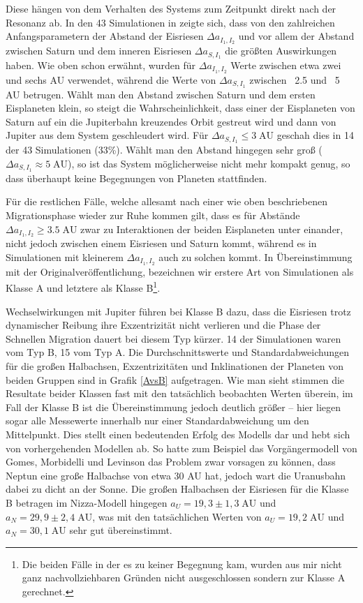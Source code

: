 \documentclass[10pt,a4paper,twoside]{article}
\begin{document}
\newcommand{\AU}{\;\mathrm{AU}}
\newcommand{\DII}{\Delta a_{I_1,I_2}}
\newcommand{\DSI}{\Delta a_{S,I_1}} %
Diese hängen von dem Verhalten des Systems zum Zeitpunkt direkt nach der Resonanz ab. In den 43 Simulationen in \cite{Tsiganis2005} zeigte sich, dass von den zahlreichen Anfangsparametern der Abstand der Eisriesen $\DII$ und vor allem der Abstand zwischen Saturn und dem inneren Eisriesen $\DSI$ die größten Auswirkungen haben\cite{Tsiganis2005}. %
Wie oben schon erwähnt, wurden für $\DII$ Werte zwischen etwa zwei und sechs AU verwendet, während die Werte von $\DSI$ zwischen ~2.5 und ~5 AU betrugen\cite{Tsiganis2005}.
Wählt man den Abstand zwischen Saturn und dem ersten Eisplaneten klein, so steigt die Wahrscheinlichkeit, dass einer der Eisplaneten von Saturn auf ein die Jupiterbahn kreuzendes Orbit gestreut wird und dann von Jupiter aus dem System geschleudert wird. Für $\DSI \le 3 \AU $ geschah dies in 14 der 43 Simulationen (33\%).
Wählt man den Abstand hingegen sehr groß ($\DSI \approx 5 \AU$), so ist das System möglicherweise nicht mehr kompakt genug, so dass überhaupt keine Begegnungen von Planeten stattfinden. %

Für die restlichen Fälle, welche allesamt nach einer wie oben beschriebenen Migrationsphase wieder zur Ruhe kommen %
gilt, dass es für Abstände $\DII \ge 3.5 \AU$ zwar zu Interaktionen der beiden Eisplaneten unter einander, nicht jedoch zwischen einem Eisriesen und Saturn kommt, während es in Simulationen mit kleinerem $\DII$ auch zu solchen kommt. In Übereinstimmung mit der Originalveröffentlichung, bezeichnen wir erstere Art von Simulationen als Klasse A und letztere als Klasse B\footnote{Die beiden Fälle in der es zu keiner Begegnung kam, wurden aus mir nicht ganz nachvollziehbaren Gründen nicht ausgeschlossen sondern zur Klasse A gerechnet.}.

Wechselwirkungen mit Jupiter führen bei Klasse B dazu, dass die Eisriesen trotz dynamischer Reibung ihre Exzentrizität nicht verlieren und die Phase der Schnellen Migration dauert bei diesem Typ kürzer.
14 der Simulationen waren vom Typ B, 15 vom Typ A.
Die Durchschnittswerte und Standardabweichungen für die großen Halbachsen, Exzentrizitäten und Inklinationen der Planeten von beiden Gruppen sind in Grafik \ref{AvsB} aufgetragen. Wie man sieht stimmen die Resultate beider Klassen fast mit den tatsächlich beobachten Werten überein, im Fall der Klasse B ist die Übereinstimmung jedoch deutlich größer – hier liegen sogar alle Messewerte innerhalb nur einer Standardabweichung um den Mittelpunkt\cite{Tsiganis2005}.
Dies stellt einen bedeutenden Erfolg des Modells dar und hebt sich von vorhergehenden Modellen ab.
So hatte zum Beispiel das Vorgängermodell von Gomes, Morbidelli und Levinson \cite{Gomes2004} %
das Problem zwar vorsagen zu können, dass Neptun eine große Halbachse von etwa 30 AU hat, jedoch wart die Uranusbahn dabei zu dicht an der Sonne.
Die großen Halbachsen der Eisriesen für die Klasse B betragen im Nizza-Modell hingegen $a_U = 19,3 \pm 1,3 \AU$ und $a_N = 29,9 \pm 2,4 \AU$, was mit den tatsächlichen Werten von $a_U = 19,2 \AU$ und $a_N = 30,1 \AU$ sehr gut übereinstimmt\cite{Tsiganis2005}.
\end{document}
